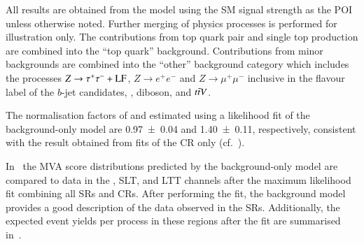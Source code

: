 All results are obtained from the model using the SM \HH signal strength as the
POI unless otherwise noted. Further merging of physics processes is performed
for illustration only. The contributions from top quark pair and single top
production are combined into the ``top quark'' background. Contributions from
minor backgrounds are combined into the ``other'' background category which
includes the processes $Z \to \tau^{+} \tau^{-} + \text{LF}$, $Z \to e^{+}e^{-}$ and
$Z \to \mu^{+}\mu^{-}$ inclusive in the flavour label of the $b$-jet candidates,
\Wjets, diboson, and $t\bar{t} V$.

The normalisation factors of \ttbar and \ZHF estimated using a likelihood fit of
the background-only model are \num{0.97 +- 0.04} and \num{1.40 +- 0.11},
respectively, consistent with the result obtained from fits of the CR only (cf.\
).

In~ the MVA score distributions predicted by the
background-only model are compared to data in the \hadhad, \lephad SLT, and
\lephad LTT channels after the maximum likelihood fit combining all SRs and
CRs. After performing the fit, the background model provides a good description
of the data observed in the SRs. Additionally, the expected event yields per
process in these regions after the fit are summarised
in~.

